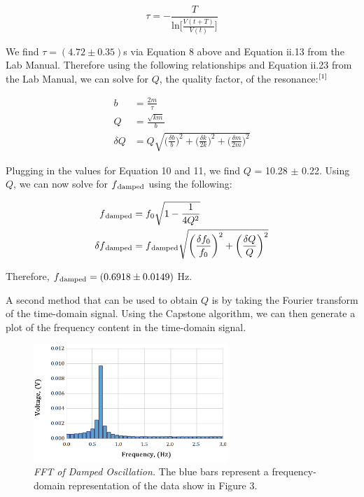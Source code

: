 \documentclass[twoside,twocolumn]{article}
\begin{document}
\footnotesize
\begin{equation}
\tau = -\frac{T}{\text{ln}\Big [\frac{V(t+T)}{V(t)}\Big ]}
\end{equation}
\normalsize

\noindent We find $\tau = (4.72 \pm 0.35)$s via Equation 8 above and Equation ii.13 from the Lab Manual. Therefore using the following relationships and Equation ii.23 from the Lab Manual, we can solve for $Q$, the quality factor, of the resonance:$\textsuperscript{[1]}$

\footnotesize
\begin{align}
b &= \frac{2m}{\tau} \\
Q &= \frac{\sqrt{km}}{b} \\
\delta Q &= Q\sqrt{\bigg (\frac{\delta b}{b}\bigg )^2 + \bigg (\frac{\delta k}{2k}\bigg )^2 + \bigg (\frac{\delta m}{2m}\bigg )^2}
\end{align}
\normalsize

\noindent Plugging in the values for Equation 10 and 11, we find $Q$ = 10.28 $\pm$ 0.22. Using $Q$, we can now solve for $f\textsubscript{damped}$ using the following:

\footnotesize
\begin{align}
f\textsubscript{damped} &= f_0\sqrt{1-\frac{1}{4Q^2}} \\
\delta f\textsubscript{damped} &= f\textsubscript{damped}\sqrt{\bigg (\frac{\delta f_0}{f_0}\bigg )^2 + \bigg (\frac{\delta Q}{Q}\bigg )^2}
\end{align}
\normalsize

\noindent Therefore, $f\textsubscript{damped} = (0.6918 \pm 0.0149)$ Hz.

\hfill

\noindent A second method that can be used to obtain $Q$ is by taking the Fourier transform of the time-domain signal. Using the Capstone algorithm, we can then generate a plot of the frequency content in the time-domain signal.

\begin{figure}[!htbp]
    \centering
    \includegraphics[width=2.9in]{FFT.png}
    \caption{\textit{FFT of Damped Oscillation.} The blue bars represent a frequency-domain representation of the data show in Figure 3.}
\end{figure}
\end{document}
